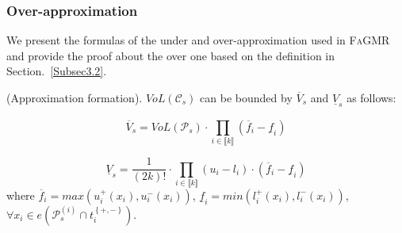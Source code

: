 \documentclass[runningheads]{llncs}
\newcommand{\ourtool}{\textsc{FaGMR}\xspace}
\begin{document}
\subsubsection{Over-approximation}
We present the formulas of the under and over-approximation used in \ourtool and provide the proof about the over one based on the definition in Section.~\ref{Subsec3.2}.
\begin{theorem}
\label{theorem1}
(Approximation formation). $VoL(\mathcal{C}_{s})$ can be bounded by $\overline{V}_{s}$ and $\underline{V}_{s}$ as follows:

\begin{equation}\label{over}
\overline{V}_{s} = VoL(\mathcal{P}_{s}) \cdot \prod_{i\in \llbracket  k \rrbracket}^{}(\overline{f}_{i} - \underline{f}_{i})
\end{equation}

\begin{equation}\label{under}
\underline{V}_{s} = \dfrac{1}{(2k)!} \cdot \prod_{i\in \llbracket  k \rrbracket}^{} (u_{i} - l_{i}) \cdot(\overline{f}_{i} - \underline{f}_{i})
\end{equation}
where $\overline{f}_{i} = max(u^{+ }_{i}(x_{i}),u^{-}_{i}(x_{i}))$, $\underline{f}_{i} = min(l^{+ }_{i}(x_{i}),l^{-}_{i}(x_{i}))$, $\forall x_{i} \in  e(\mathcal{P}^{(i)}_{s} \cap t_{i}^{\left\{ +, -\right\}} )$.
\end{theorem}
\end{document}
